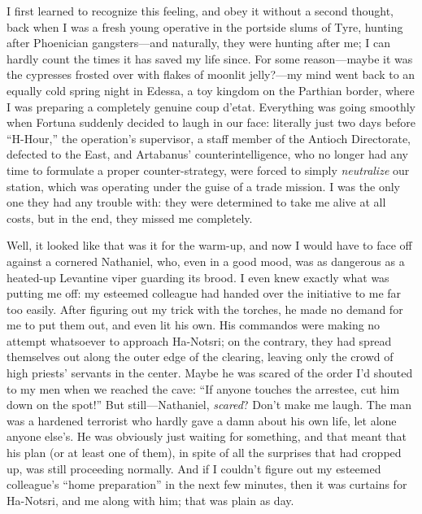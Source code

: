 I first learned to recognize this feeling, and obey it without a second thought, back when I was a fresh young operative in the portside slums of Tyre, hunting after Phoenician gangsters---and naturally, they were hunting after me; I can hardly count the times it has saved my life since. For some reason---maybe it was the cypresses frosted over with flakes of moonlit jelly?---my mind went back to an equally cold spring night in Edessa, a toy kingdom on the Parthian border, where I was preparing a completely genuine coup d'etat. Everything was going smoothly when Fortuna suddenly decided to laugh in our face: literally just two days before ``H-Hour,'' the operation's supervisor, a staff member of the Antioch Directorate, defected to the East, and Artabanus' counterintelligence, who no longer had any time to formulate a proper counter-strategy, were forced to simply \emph{neutralize} our station, which was operating under the guise of a trade mission. I was the only one they had any trouble with: they were determined to take me alive at all costs, but in the end, they missed me completely.

Well, it looked like that was it for the warm-up, and now I would have to face off against a cornered Nathaniel, who, even in a good mood, was as dangerous as a heated-up Levantine viper guarding its brood. I even knew exactly what was putting me off: my esteemed colleague had handed over the initiative to me far too easily. After figuring out my trick with the torches, he made no demand for me to put them out, and even lit his own. His commandos were making no attempt whatsoever to approach Ha-Notsri; on the contrary, they had spread themselves out along the outer edge of the clearing, leaving only the crowd of high priests' servants in the center. Maybe he was scared of the order I'd shouted to my men when we reached the cave: ``If anyone touches the arrestee, cut him down on the spot!'' But still---Nathaniel, \emph{scared}? Don't make me laugh. The man was a hardened terrorist who hardly gave a damn about his own life, let alone anyone else's. He was obviously just waiting for something, and that meant that his plan (or at least one of them), in spite of all the surprises that had cropped up, was still proceeding normally. And if I couldn't figure out my esteemed colleague's ``home preparation'' in the next few minutes, then it was curtains for Ha-Notsri, and me along with him; that was plain as day.

